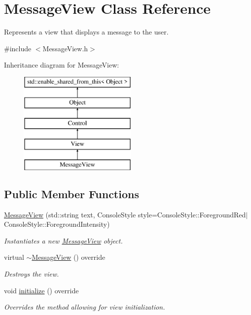 \hypertarget{class_message_view}{}\section{Message\+View Class Reference}
\label{class_message_view}


Represents a view that displays a message to the user.  




{\ttfamily \#include $<$Message\+View.\+h$>$}

Inheritance diagram for Message\+View\+:\begin{figure}[H]
\begin{center}
\leavevmode
\includegraphics[height=5.000000cm]{class_message_view}
\end{center}
\end{figure}
\subsection*{Public Member Functions}
\begin{DoxyCompactItemize}
\item 
\mbox{\hyperlink{class_message_view_abc1653c6ab2af11fde46ae4ad229edf5}{Message\+View}} (std\+::string text, Console\+Style style=Console\+Style\+::\+Foreground\+Red$\vert$Console\+Style\+::\+Foreground\+Intensity)
\begin{DoxyCompactList}\small\item\em Instantiates a new \mbox{\hyperlink{class_message_view}{Message\+View}} object. \end{DoxyCompactList}\item 
virtual \mbox{\hyperlink{class_message_view_a077941ec2d1a8de678ec78cdbc420716}{$\sim$\+Message\+View}} () override
\begin{DoxyCompactList}\small\item\em Destroys the view. \end{DoxyCompactList}\item 
void \mbox{\hyperlink{class_message_view_a869de4a6b084eb205184de7f524160e2}{initialize}} () override
\begin{DoxyCompactList}\small\item\em Overrides the method allowing for view initialization. \end{DoxyCompactList}\end{DoxyCompactItemize}
